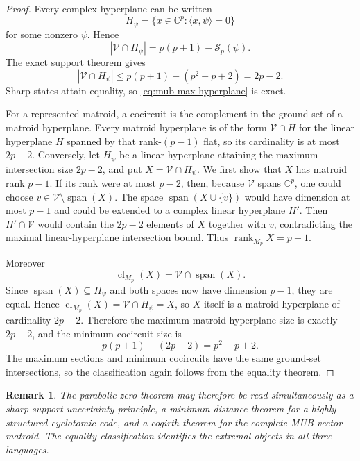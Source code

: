 \documentclass[11pt]{article}
\newtheorem{remark}[theorem]{Remark}
\newcommand{\C}{\mathbb C}
\begin{document}
\begin{proof}
Every complex hyperplane can be written
\[
 H_\psi
 =
 \{x\in\C^p:\langle x,\psi\rangle=0\}
\]
for some nonzero \(\psi\).  Hence
\[
 |\mathcal V\cap H_\psi|
 =
 p(p+1)-\mathcal S_p(\psi).
\]
The exact support theorem gives
\[
 |\mathcal V\cap H_\psi|
 \le
 p(p+1)-(p^2-p+2)
 =
 2p-2.
\]
Sharp states attain equality, so
\eqref{eq:mub-max-hyperplane} is exact.

For a represented matroid, a cocircuit is the complement in the ground
set of a matroid hyperplane.  Every matroid hyperplane is of the form
\(\mathcal V\cap H\) for the linear hyperplane \(H\) spanned by that
rank-\((p-1)\) flat, so its cardinality is at most \(2p-2\).
Conversely, let \(H_\psi\) be a linear hyperplane attaining the maximum
intersection size \(2p-2\), and put \(X=\mathcal V\cap H_\psi\).  We first
show that \(X\) has matroid rank \(p-1\).  If its rank were at most \(p-2\),
then, because \(\mathcal V\) spans \(\C^p\), one could choose
\(v\in\mathcal V\setminus\operatorname{span}(X)\).  The space
\(\operatorname{span}(X\cup\{v\})\) would have dimension at most \(p-1\)
and could be extended to a complex linear hyperplane \(H'\).  Then
\(H'\cap\mathcal V\) would contain the \(2p-2\) elements of \(X\) together
with \(v\), contradicting the maximal linear-hyperplane intersection bound.
Thus \(\operatorname{rank}_{M_p}X=p-1\).

Moreover
\[
 \operatorname{cl}_{M_p}(X)
 =\mathcal V\cap\operatorname{span}(X).
\]
Since \(\operatorname{span}(X)\subseteq H_\psi\) and both spaces now have
dimension \(p-1\), they are equal.  Hence
\(\operatorname{cl}_{M_p}(X)=\mathcal V\cap H_\psi=X\), so \(X\) itself is
a matroid hyperplane of cardinality \(2p-2\).  Therefore the maximum
matroid-hyperplane size is exactly \(2p-2\), and the minimum cocircuit size is
\[
 p(p+1)-(2p-2)
 =
 p^2-p+2.
\]
The maximum sections and minimum cocircuits have the same ground-set
intersections, so the classification again follows from the equality
theorem.
\end{proof}

\begin{remark}
The parabolic zero theorem may therefore be read simultaneously as a
sharp support uncertainty principle, a minimum-distance theorem for a
highly structured cyclotomic code, and a cogirth theorem for the
complete-MUB vector matroid.  The equality classification identifies
the extremal objects in all three languages.
\end{remark}
\end{document}
